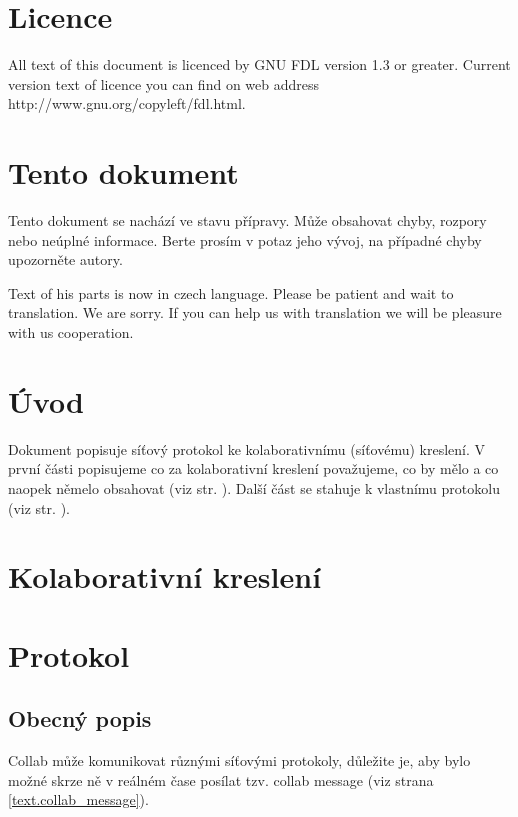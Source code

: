 \documentclass[12pt,oneside,a4paper]{report}
\begin{document}
\tableofcontents
\newpage


\part{Licence}

All text of this document is licenced by GNU FDL version 1.3 or greater. Current version text of licence you can find on web address http://www.gnu.org/copyleft/fdl.html.

\part{Tento dokument}

Tento dokument se nachází ve stavu přípravy. Může obsahovat chyby, rozpory nebo neúplné informace. Berte prosím v potaz jeho vývoj, na případné chyby upozorněte autory.

Text of his parts is now in czech language. Please be patient and wait to translation. We are sorry. If you can help us with translation we will be pleasure with us cooperation.

\part{Úvod}

Dokument popisuje síťový protokol ke kolaborativnímu (síťovému) kreslení. V první části popisujeme co za kolaborativní kreslení považujeme, co by mělo a co naopek němelo obsahovat (viz str. \ref{part.colaborative-painting}). Další část se stahuje k vlastnímu protokolu (viz str. \ref{part.protocol}).

\part{Kolaborativní kreslení}
\label{part.colaborative-painting}


\part{Protokol}
\label{part.protocol}


\chapter{Obecný popis}

Collab může komunikovat různými síťovými protokoly, důležite je, aby bylo možné skrze ně v reálném čase posílat tzv. collab message (viz strana \ref{text.collab_message}).
\end{document}

